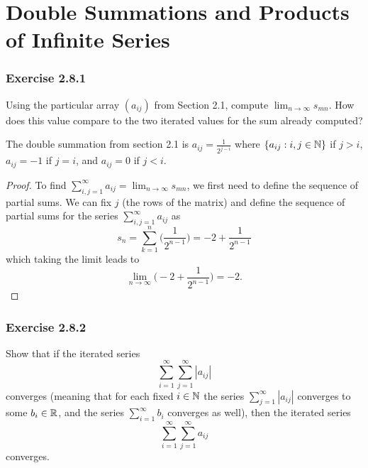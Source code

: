 
\section{Double Summations and Products of Infinite Series}


\subsubsection{Exercise 2.8.1} Using the particular array \( (a_{ij})\) from Section 2.1, compute \( \lim_{n \to \infty} s_{mn}\). How does this value compare to the two iterated values for the sum already computed?  

The double summation from section 2.1 is \( a_{ij} = \frac{1}{2^{j-i}}\) where \( \{ a_{ij} : i, j \in \mathbb{N}  \}\) if \( j > i \), \( a_{ij} = -1 \) if \( j = i \), and \( a_{ij} = 0 \) if \( j < i \). 
\begin{proof}
    To find \( \sum_{i,j = 1}^{\infty} a_{ij} = \lim_{n \to \infty} s_{mn}\), we first need to define the sequence of partial sums. We can fix \( j \) (the rows of the matrix) and define the sequence of partial sums for the series \( \sum_{i,j = 1 }^{\infty} a_{ij}\) as 
    \[ s_n = \sum_{k=1}^{n} \Big( \frac{1}{2^{n-1}}\Big) = -2 + \frac{1}{2^{n-1}} \]
    which taking the limit leads to 
    \[ \lim_{n \to \infty} \Big( -2 + \frac{1}{2^{n-1}} \Big) = -2.\]

\end{proof}




\subsubsection{Exercise 2.8.2}

Show that if the iterated series 
\[ \sum_{i=1}^{\infty} \sum_{j=1}^{\infty} |a_{ij}|\]
converges (meaning that for each fixed \( i \in \mathbb{N} \) the series \( \sum_{j=1}^{\infty} |a_{ij}|\) converges to some \( b_i \in \mathbb{R} \), and the series \( \sum_{i=1}^{\infty} b_i \) converges as well), then the iterated series 
\[ \sum_{i=1}^{\infty} \sum_{j=1}^{\infty} a_{ij}\]
converges.

